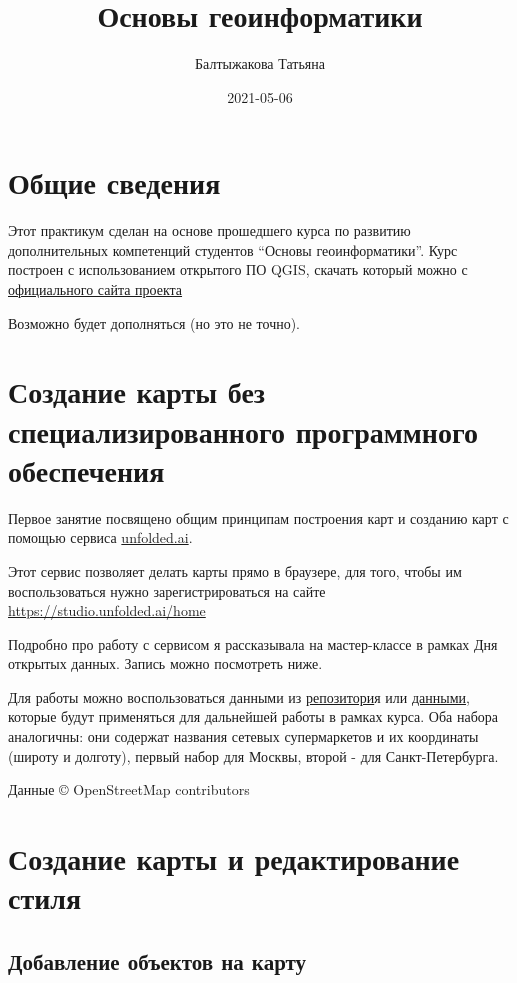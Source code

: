 \documentclass[
]{book}
\title{Основы геоинформатики}
\author{Балтыжакова Татьяна}
\date{2021-05-06}
\begin{document}
\maketitle

{
\setcounter{tocdepth}{1}
\tableofcontents
}
\hypertarget{intro}{%
\chapter{Общие сведения}\label{intro}}

Этот практикум сделан на основе прошедшего курса по развитию дополнительных компетенций студентов ``Основы геоинформатики''. Курс построен с использованием открытого ПО QGIS, скачать который можно с \href{https://qgis.org/ru/site/}{официального сайта проекта}

Возможно будет дополняться (но это не точно).

\hypertarget{unfolded}{%
\chapter{Создание карты без специализированного программного обеспечения}\label{unfolded}}

Первое занятие посвящено общим принципам построения карт и созданию карт с помощью сервиса \url{unfolded.ai}.

Этот сервис позволяет делать карты прямо в браузере, для того, чтобы им воспользоваться нужно зарегистрироваться на сайте \url{https://studio.unfolded.ai/home}

Подробно про работу с сервисом я рассказывала на мастер-классе в рамках Дня открытых данных. Запись можно посмотреть ниже.

Для работы можно воспользоваться данными из \href{https://github.com/baltti/opendataday-21}{репозитори}я или \href{https://drive.google.com/file/d/171Ts_FX2DFOojv0ru7ApN0wXWhMFVtcF/view?usp=sharing}{данными}, которые будут применяться для дальнейшей работы в рамках курса. Оба набора аналогичны: они содержат названия сетевых супермаркетов и их координаты (широту и долготу), первый набор для Москвы, второй - для Санкт-Петербурга.

Данные © OpenStreetMap contributors

\hypertarget{basics}{%
\chapter{Создание карты и редактирование стиля}\label{basics}}

\hypertarget{ux434ux43eux431ux430ux432ux43bux435ux43dux438ux435-ux43eux431ux44aux435ux43aux442ux43eux432-ux43dux430-ux43aux430ux440ux442ux443}{%
\section{Добавление объектов на карту}\label{ux434ux43eux431ux430ux432ux43bux435ux43dux438ux435-ux43eux431ux44aux435ux43aux442ux43eux432-ux43dux430-ux43aux430ux440ux442ux443}}
\end{document}
